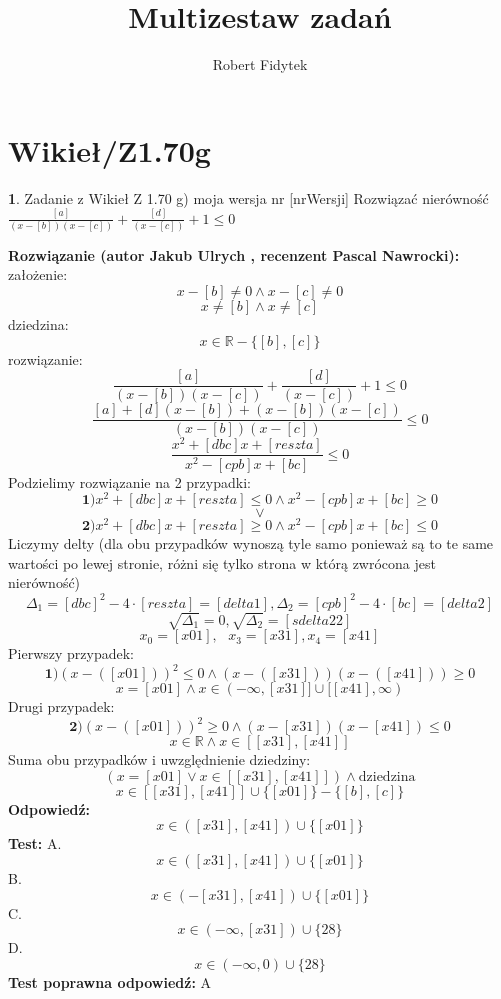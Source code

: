 \documentclass[12pt, a4paper]{article}
\title{Multizestaw zadań}
\author{Robert Fidytek}
\date{}
\theoremstyle{definition} %
\newtheorem{zad}{}
\newcommand{\kategoria}[1]{\section{#1}} %
\newcommand{\zadStart}[1]{\begin{zad}#1\newline} %
\newcommand{\zadStop}{\end{zad}}   %
\newcommand{\rozwStart}[2]{\noindent \textbf{Rozwiązanie (autor #1 , recenzent #2): }\newline} %
\newcommand{\rozwStop}{\newline}                                            %
\newcommand{\odpStart}{\noindent \textbf{Odpowiedź:}\newline}    %
\newcommand{\odpStop}{\newline}                                             %
\newcommand{\testStart}{\noindent \textbf{Test:}\newline} %
\newcommand{\testStop}{\newline} %
\newcommand{\kluczStart}{\noindent \textbf{Test poprawna odpowiedź:}\newline} %
\newcommand{\kluczStop}{\newline} %
\begin{document}
\maketitle


\kategoria{Wikieł/Z1.70g}
\zadStart{Zadanie z Wikieł Z 1.70 g) moja wersja nr [nrWersji]}
Rozwiązać nierówność $\frac{[a]}{(x-[b])(x-[c])}+\frac{[d]}{(x-[c])}+1\leq0$
\zadStop
\rozwStart{Jakub Ulrych}{Pascal Nawrocki}
założenie: $$x-[b]\neq0\land x-[c]\neq0$$
$$x\neq[b]\land x\neq[c]$$
dziedzina:$$x\in \mathbb{R}-\{[b],[c]\}$$
rozwiązanie:$$\frac{[a]}{(x-[b])(x-[c])}+\frac{[d]}{(x-[c])}+1\leq0$$
$$\frac{[a]+[d](x-[b])+(x-[b])(x-[c])}{(x-[b])(x-[c])}\leq0$$
$$\frac{x^{2}+[dbc]x+[reszta]}{x^{2}-[cpb]x+[bc]}\leq0$$
Podzielimy rozwiązanie na 2 przypadki:
$$\textbf{1)}x^{2}+[dbc]x+[reszta]\leq0 \land x^{2}-[cpb]x+[bc]\geq0$$ $$\vee$$ $$\textbf{2)}x^{2}+[dbc]x+[reszta]\geq0 \land x^{2}-[cpb]x+[bc]\leq0$$
Liczymy delty (dla obu przypadków wynoszą tyle samo ponieważ są to te same wartości po lewej stronie, różni się tylko strona w którą zwrócona jest nierówność)
$$\Delta_{1}=[dbc]^{2}-4\cdot[reszta]=[delta1], \Delta_{2}=[cpb]^{2}-4\cdot [bc]=[delta2]$$
$$\sqrt{\Delta_{1}}=0,\sqrt{\Delta_{2}}=[sdelta22]$$
$$x_{0}=[x01], \text{   }x_{3}=[x31],x_{4}=[x41]$$
Pierwszy przypadek:
$$\textbf{1)}(x-([x01]))^{2}\leq0 \land (x-([x31]))(x-([x41]))\geq0$$
$$x=[x01]\land x\in(-\infty,[x31]]\cup [[x41],\infty)$$
Drugi przypadek:$$\textbf{2)}(x-([x01]))^{2}\geq0 \land (x-[x31])(x-[x41])\leq0$$
$$x\in\mathbb{R}\land x\in[[x31],[x41]]$$
Suma obu przypadków i uwzględnienie dziedziny:
$$(x=[x01] \vee x\in[[x31],[x41]])\land\text{dziedzina}$$
$$x\in[[x31],[x41]]\cup \{[x01]\}-\{[b],[c]\}$$
\rozwStop
\odpStart
$$x\in([x31],[x41])\cup \{[x01]\}$$
\odpStop
\testStart
A.$$x\in([x31],[x41])\cup \{[x01]\}$$
B.$$x\in(-[x31],[x41])\cup \{[x01]\}$$
C.$$x\in(-\infty,[x31])\cup\{28\}$$
D.$$x\in(-\infty,0)\cup\{28\}$$
\testStop
\kluczStart
A
\kluczStop
\end{document}
